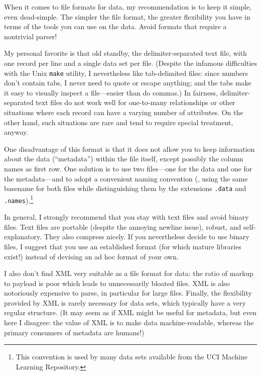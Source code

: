 When it comes to file formats for data, my recommendation is to keep
it simple, even dead-simple. The simpler the file format, the greater
flexibility you have in terms of the tools you can use on the data.
Avoid formats that require a nontrivial parser!

My personal favorite is that old standby, the delimiter-separated text
file, with one record per line and a single data set per file.
(Despite the infamous difficulties with the Unix \texttt{make}
utility, I nevertheless like tab-delimited files: since numbers don't
contain tabs, I never need to quote or escape anything; and the tabs
make it easy to visually inspect a file---easier than do commas.)
In fairness, delimiter-separated text files do not work well for
one-to-many relationships or other situations where each record can
have a varying number of attributes. On the other hand, such
situations are rare and tend to require special treatment, anyway.

One disadvantage of this format is that it does not allow you to keep
information about the data (``metadata'') within the file itself,
except possibly the column names as first row. One solution is to use
two files---one for the data and one for the metadata---and to adopt a
convenient naming convention (\eg, using the same basename for both
files while distinguishing them by the extensions \texttt{.data} and
\texttt{.names}).\footnote{This convention is used by many data sets
  available from the UCI Machine Learning Repository.}

In general, I strongly recommend that you stay with text files and
avoid binary files. Text files are portable (despite the annoying
newline issue), robust, and self-explanatory. They also compress
nicely. If you nevertheless decide to use binary files, I suggest that
you use an established format (for which mature libraries exist!)
instead of devising an ad hoc format of your own.

I also don't find XML very suitable as a file format for data:  the
ratio of markup to payload is poor which leads to unnecessarily
bloated files. XML is also notoriously expensive to parse, in
particular for large files. Finally, the flexibility provided by XML
is rarely necessary for data sets, which typically have a very regular
structure. (It may seem as if XML might be useful for metadata, but
even here I disagree: the value of XML is to make data
machine-readable, whereas the primary consumers of metadata are
humans!)

